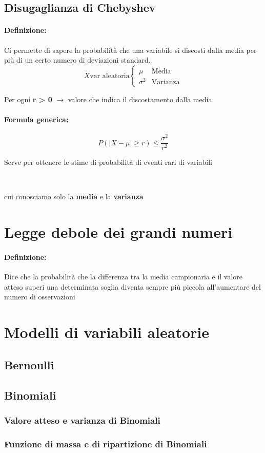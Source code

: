\documentclass[]{article}
\newcommand{\definizione}{\paragraph{Definizione:}}
\newcommand{\formula}{\paragraph{Formula generica:}}
\begin{document}
    \subsection{Disugaglianza di Chebyshev}
    \definizione Ci permette di sapere la probabilità che una variabile si discosti dalla media per più di un certo numero di deviazioni standard.
    \begin{equation*}
        X \text{var aleatoria}
        \begin{cases}
            \mu & \text{Media} \\
            \sigma^2 & \text{Varianza}
        \end{cases}
    \end{equation*}

    \centerline{Per ogni \textbf{r > 0} $\longrightarrow$ valore che indica il discostamento dalla media}
    \formula 
    \[ P(|X - \mu| \geq r) \leq \frac{\sigma^2}{r^2} \]
    \centerline{Serve per ottenere le stime di probabilità di eventi rari di variabili} \\
    \centerline{cui conosciamo solo la \textbf{media} e la \textbf{varianza}}
    \section{Legge debole dei grandi numeri}
    \definizione Dice che la probabilità che la differenza tra la media campionaria e il valore atteso superi una determinata soglia diventa sempre più piccola all'aumentare del numero di osservazioni

    \newpage
    \section{Modelli di variabili aleatorie}

    \subsection{Bernoulli}

    \subsection{Binomiali}
    \subsubsection{Valore atteso e varianza di Binomiali}
    \subsubsection{Funzione di massa e di ripartizione di Binomiali}
\end{document}
